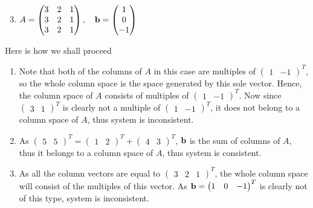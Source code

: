 \documentclass[8pt]{article} %
\begin{document}
\begin{description}
{	\begin{enumerate}[label=(\alph*)]
		\setcounter{enumi}{2}
		\item $A=\begin{pmatrix}3&2&1\\3&2&1\\3&2&1\end{pmatrix},\quad\mathbf{b}=\begin{pmatrix}1\\0\\-1\end{pmatrix}$
	\end{enumerate}
	Here is how we shall proceed
	\begin{enumerate}[label=(\alph*)]
			\newcommand{\icv}[1]{$\begin{pmatrix}#1\end{pmatrix}^T$}
		\item{Note that both of the columns of $A$ in this case are multiples of $\begin{pmatrix}1&-1\end{pmatrix}^T$, so the whole
			column space is the space generated by this sole vector. Hence, the column space of $A$ consists of multiples
			of $\begin{pmatrix}1&-1\end{pmatrix}^T$. Now since $\begin{pmatrix}3&1\end{pmatrix}^T$ is clearly not
			a multiple of $\begin{pmatrix}1&-1\end{pmatrix}^T$, it does not belong to a column space of $A$, thus system
			is inconsistent.}
		\item{As $\begin{pmatrix}5&5\end{pmatrix}^T=\begin{pmatrix}1&2\end{pmatrix}^T+\begin{pmatrix}4&3\end{pmatrix}^T$, $\mathbf{b}$ is the
				sum of columns of $A$, thus it belongs to a column space of $A$, thus system is consistent.}
		\item As all the column vectors are equal to \icv{3&2&1}, the whole column space will consist of the multiples of this vector.
			As $\mathbf{b}=\begin{pmatrix}1&0&-1\end{pmatrix}^T$ is clearly not of this type, system is inconsistent.
	\end{enumerate}
}
\end{description}
\end{document}
